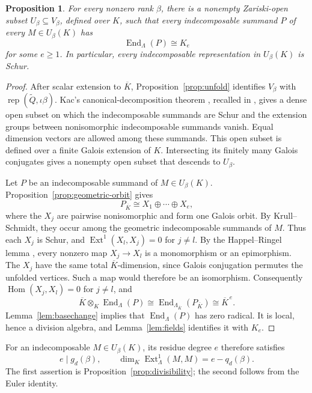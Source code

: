 \documentclass[11pt, reqno]{amsart}
\numberwithin{equation}{section}
\newtheorem{proposition}[theorem]{Proposition}
\theoremstyle{definition}
\theoremstyle{remark}
\newcommand{\op}[1]{\operatorname{#1}}
\newcommand{\End}{\op{End}}
\newcommand{\Hom}{\op{Hom}}
\newcommand{\Ext}{\op{Ext}}
\newcommand{\Rep}{\op{rep}}
\newcommand{\Qbar}{\widetilde Q}
\newcommand{\Kbar}{\overline K}
\newcommand{\iso}{\cong}
\begin{document}
\begin{proposition}\label{prop:generic-schur-summands}
For every nonzero rank $\beta$, there is a nonempty Zariski-open subset
$U_\beta\subseteq V_\beta$, defined over $K$, such that every
indecomposable summand $P$ of every $M\in U_\beta(K)$ has
\[ \End_\Lambda(P)\iso K_e \]
for some $e\geq1$. In particular, every indecomposable representation
in $U_\beta(K)$ is Schur.
\end{proposition}
\begin{proof}
After scalar extension to $\Kbar$, Proposition~\ref{prop:unfold}
identifies $V_\beta$ with $\Rep(\Qbar,\iota\beta)$.
Kac's canonical-decomposition theorem
\cite[Section~4 and Proposition~3]{Kac82}, recalled in
\cite[Theorem~2.13]{DWcomb}, gives a dense open subset on which the
indecomposable summands are Schur and the extension groups between
nonisomorphic indecomposable summands vanish. Equal dimension vectors
are allowed among these summands.
This open subset is defined over a finite Galois extension of $K$.
Intersecting its finitely many Galois conjugates gives a nonempty
open subset that descends to $U_\beta$.

Let $P$ be an indecomposable summand of $M\in U_\beta(K)$.
Proposition~\ref{prop:geometric-orbit} gives
\[ P_{\Kbar}\iso X_1\oplus\cdots\oplus X_e, \]
where the $X_j$ are pairwise nonisomorphic and form one Galois orbit.
By Krull--Schmidt, they occur among the geometric indecomposable
summands of $M$. Thus each $X_j$ is Schur, and
$\Ext^1(X_l,X_j)=0$ for $j\ne l$.
By the Happel--Ringel lemma \cite[Lemma~4.1]{HR82}, every nonzero map
$X_j\to X_l$ is a monomorphism or an epimorphism. The $X_j$ have the
same total $\Kbar$-dimension, since Galois conjugation permutes the
unfolded vertices. Such a map would therefore be an isomorphism.
Consequently $\Hom(X_j,X_l)=0$ for $j\ne l$, and
\[ \Kbar\otimes_K\End_\Lambda(P)
   \iso\End_{\Lambda_{\Kbar}}(P_{\Kbar})\iso\Kbar^{\,e}. \]
Lemma~\ref{lem:basechange} implies that $\End_\Lambda(P)$ has zero
radical. It is local, hence a division algebra, and
Lemma~\ref{lem:fields} identifies it with $K_e$.
\end{proof}

For an indecomposable $M\in U_\beta(K)$, its residue degree $e$
therefore satisfies
\[ e\mid g_d(\beta),\qquad
   \dim_K\Ext^1_\Lambda(M,M)=e-q_d(\beta). \]
The first assertion is Proposition~\ref{prop:divisibility}; the
second follows from the Euler identity.
\end{document}
